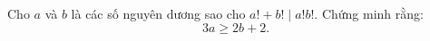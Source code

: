 \ifshowproblem
\begin{problem}\label{example:IMO-2015-SL-P2}
    Cho \( a \) và \( b \) là các số nguyên dương sao cho \( a! + b! \mid a!b! \).  
    Chứng minh rằng:
    \[
        3a \ge 2b + 2.
    \]
\end{problem}
\fi

\footnotemark
{}
\fi